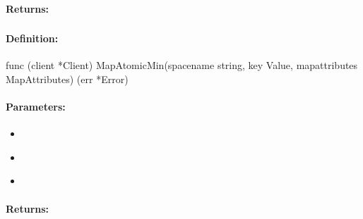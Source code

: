 \paragraph{Returns:}


\pagebreak
\subsubsection{}
\label{api:Go:MapAtomicMin}


\paragraph{Definition:}
\begin{gocode}
func (client *Client) MapAtomicMin(spacename string, key Value, mapattributes MapAttributes) (err *Error)
\end{gocode}

\paragraph{Parameters:}
\begin{itemize}[noitemsep]
\item {}\\

\item {}\\

\item {}\\

\end{itemize}

\paragraph{Returns:}


\pagebreak
\subsubsection{}
\label{api:Go:CondMapAtomicMin}


